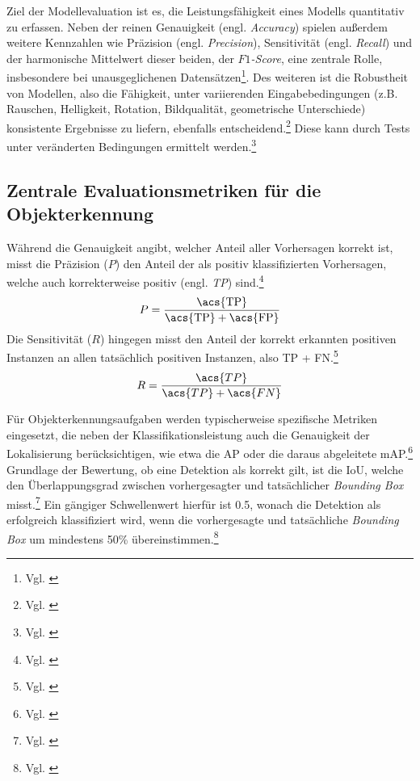 Ziel der Modellevaluation ist es, die Leistungsfähigkeit eines Modells quantitativ zu erfassen. Neben der reinen Genauigkeit (engl. \textit{Accuracy}) spielen außerdem weitere Kennzahlen wie Präzision (engl. \textit{Precision}), Sensitivität (engl. \textit{Recall}) und der harmonische Mittelwert dieser beiden, der \textit{\(F1\)-Score}, eine zentrale Rolle, insbesondere bei unausgeglichenen Datensätzen\footnote{Vgl. \cite[S. 65240]{arslanoglu_vision_2025}}. Des weiteren ist die Robustheit von Modellen, also die Fähigkeit, unter variierenden Eingabebedingungen (z.B. Rauschen, Helligkeit, Rotation, Bildqualität, geometrische Unterschiede) konsistente Ergebnisse zu liefern, ebenfalls entscheidend.\footnote{Vgl. \cite[S. 65234]{arslanoglu_vision_2025}} Diese kann durch Tests unter veränderten Bedingungen ermittelt werden.\footnote{Vgl. \cite[S. 323]{zhang_computer_2023}}

\subsection{Zentrale Evaluationsmetriken für die Objekterkennung}

Während die Genauigkeit angibt, welcher Anteil aller Vorhersagen korrekt ist, misst die Präzision (\(P\)) den Anteil der als positiv klassifizierten Vorhersagen, welche auch korrekterweise positiv (engl. \textit{\ac{TP}}) sind.\footnote{Vgl. \cite[S. 65240]{arslanoglu_vision_2025}}
\[
P = \frac{\text{\acs{TP}}}{\text{\acs{TP}} + \text{\acs{FP}}}
\]
Die Sensitivität (\(R\)) hingegen misst den Anteil der korrekt erkannten positiven Instanzen an allen tatsächlich positiven Instanzen, also \acf{TP} + \ac{FN}.\footnote{Vgl. \cite[S. 65240]{arslanoglu_vision_2025}} 
\[
R = \frac{\acs{TP}}{\acs{TP} + \acs{FN}}
\]

Für Objekterkennungsaufgaben werden typischerweise spezifische Metriken eingesetzt, die neben der Klassifikationsleistung auch die Genauigkeit der Lokalisierung berücksichtigen, wie etwa die \ac{AP} oder die daraus abgeleitete \ac{mAP}.\footnote{Vgl. \cite[S. 94272]{khanam_comprehensive_2024}} Grundlage der Bewertung, ob eine Detektion als korrekt gilt, ist die \ac{IoU}, welche den Überlappungsgrad zwischen vorhergesagter und tatsächlicher \textit{Bounding Box} misst.\footnote{Vgl. \cite[S. 94272]{khanam_comprehensive_2024}} Ein gängiger Schwellenwert hierfür ist 0.5, wonach die Detektion als erfolgreich klassifiziert wird, wenn die vorhergesagte und tatsächliche \textit{Bounding Box} um mindestens 50\% übereinstimmen.\footnote{Vgl. \cite[S. 94272]{khanam_comprehensive_2024}}

